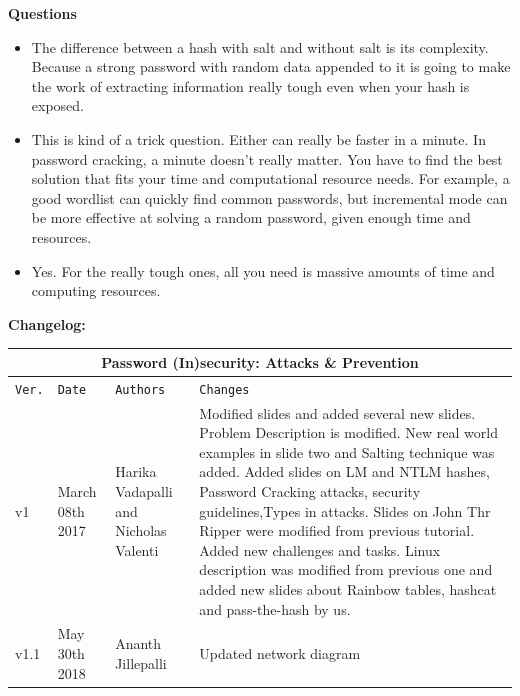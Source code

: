 \documentclass[12pt]{article}
\begin{document}
\textbf{Questions}

\begin{itemize}

	\item The difference between a hash with salt and without salt is its complexity. Because a strong password with random data appended to it is going to make the work of extracting information really tough even when your hash is exposed.
	\item This is kind of a trick question. Either can really be faster in a minute. In password cracking, a minute doesn't really matter. You have to find the best solution that fits your time and computational resource needs. For example, a good wordlist can quickly find common passwords, but incremental mode can be more effective at solving a random password, given enough time and resources. \\
	\item Yes. For the really tough ones, all you need is massive amounts of time and computing resources.
\end{itemize}	

\pagebreak	
\textbf{Changelog:}
\label{changelog}
\vspace{6mm}


\begin{tabular}{ |p{1cm}|p{3cm}|p{3cm}|p{5cm}|  }
\hline
\multicolumn{4}{|c|}{Password (In)security: Attacks \& Prevention} \\
\hline
\texttt{Ver.} & \texttt{Date} & \texttt{Authors} & \texttt{Changes} \\
\hline
v1 & March 08th 2017 & Harika Vadapalli and Nicholas Valenti & Modified slides and added several new slides. Problem Description is modified. New real world examples in slide two and Salting technique was added. Added slides on LM and NTLM hashes, Password Cracking attacks, security guidelines,Types in attacks. Slides on John Thr Ripper were modified from previous tutorial. Added new challenges and tasks. Linux description was modified from previous one and added new slides about Rainbow tables, hashcat and pass-the-hash by us.  \\
\hline
v1.1 & May 30th 2018 & Ananth Jillepalli & Updated network diagram \\
\hline 
\end{tabular}

\pagebreak

\end{document}
